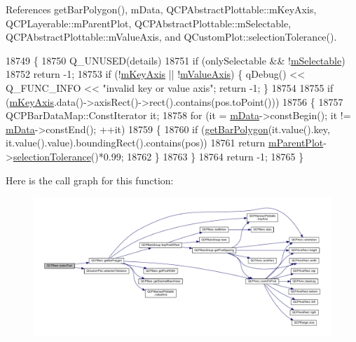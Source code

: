 References get\+Bar\+Polygon(), m\+Data, Q\+C\+P\+Abstract\+Plottable\+::m\+Key\+Axis, Q\+C\+P\+Layerable\+::m\+Parent\+Plot, Q\+C\+P\+Abstract\+Plottable\+::m\+Selectable, Q\+C\+P\+Abstract\+Plottable\+::m\+Value\+Axis, and Q\+Custom\+Plot\+::selection\+Tolerance().


\begin{DoxyCode}
18749 \{
18750   Q\_UNUSED(details)
18751   if (onlySelectable && !\hyperlink{class_q_c_p_abstract_plottable_aceee52342c8e75727abcbd164986fdcb}{mSelectable})
18752     return -1;
18753   if (!\hyperlink{class_q_c_p_abstract_plottable_a426f42e254d0f8ce5436a868c61a6827}{mKeyAxis} || !\hyperlink{class_q_c_p_abstract_plottable_a2901452ca4aea911a1827717934a4bda}{mValueAxis}) \{ qDebug() << Q\_FUNC\_INFO << \textcolor{stringliteral}{"invalid key or value axis"};
       \textcolor{keywordflow}{return} -1; \}
18754   
18755   \textcolor{keywordflow}{if} (\hyperlink{class_q_c_p_abstract_plottable_a426f42e254d0f8ce5436a868c61a6827}{mKeyAxis}.data()->axisRect()->rect().contains(pos.toPoint()))
18756   \{
18757     QCPBarDataMap::ConstIterator it;
18758     \textcolor{keywordflow}{for} (it = \hyperlink{class_q_c_p_bars_aef28d29d51ef84b608ecd22c55d531ff}{mData}->constBegin(); it != \hyperlink{class_q_c_p_bars_aef28d29d51ef84b608ecd22c55d531ff}{mData}->constEnd(); ++it)
18759     \{
18760       \textcolor{keywordflow}{if} (\hyperlink{class_q_c_p_bars_a1d118a76662cfd691a78c6f573e3f78c}{getBarPolygon}(it.value().key, it.value().value).boundingRect().contains(pos))
18761         \textcolor{keywordflow}{return} \hyperlink{class_q_c_p_layerable_aa2a528433e44db02b8aef23c1f9f90ed}{mParentPlot}->\hyperlink{class_q_custom_plot_a7b738074c75e80070ef6a10263c6cd69}{selectionTolerance}()*0.99;
18762     \}
18763   \}
18764   \textcolor{keywordflow}{return} -1;
18765 \}
\end{DoxyCode}


Here is the call graph for this function\+:\nopagebreak
\begin{figure}[H]
\begin{center}
\leavevmode
\includegraphics[width=350pt]{class_q_c_p_bars_a0d37a9feb1d0baf73ce6e809db214445_cgraph}
\end{center}
\end{figure}


